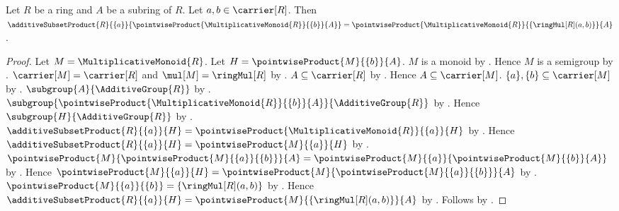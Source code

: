 \begin{proposition}\label{additive_subset_product_singleton_scalar_multiple}
    Let $R$ be a ring and $A$ be a subring of $R$.
    Let $a,b\in\carrier[R]$.
    Then $\additiveSubsetProduct{R}{\{a\}}{
            \pointwiseProduct{\MultiplicativeMonoid{R}}{\{b\}}{A}}
        =\pointwiseProduct{\MultiplicativeMonoid{R}}{
            \{\ringMul[R](a,b)\}}{A}$.
\end{proposition}
\begin{proof}
    Let $M=\MultiplicativeMonoid{R}$.
    Let $H=\pointwiseProduct{M}{\{b\}}{A}$.
    $M$ is a monoid by .
    Hence $M$ is a semigroup by .
    $\carrier[M]=\carrier[R]$ and $\mul[M]=\ringMul[R]$ by
        .
    $A\subseteq\carrier[R]$ by .
    Hence $A\subseteq\carrier[M]$.
    $\{a\},\{b\}\subseteq\carrier[M]$ by
        .
    $\subgroup{A}{\AdditiveGroup{R}}$ by
        .
    $\subgroup{
        \pointwiseProduct{\MultiplicativeMonoid{R}}{\{b\}}{A}}{
        \AdditiveGroup{R}}$ by
        .
    Hence $\subgroup{H}{\AdditiveGroup{R}}$ by \auto.
    $\additiveSubsetProduct{R}{\{a\}}{H}
        =\pointwiseProduct{\MultiplicativeMonoid{R}}{\{a\}}{H}$ by
        .
    Hence $\additiveSubsetProduct{R}{\{a\}}{H}
        =\pointwiseProduct{M}{\{a\}}{H}$ by \auto.
    $\pointwiseProduct{M}{
            \pointwiseProduct{M}{\{a\}}{\{b\}}}{A}
        =\pointwiseProduct{M}{\{a\}}{
            \pointwiseProduct{M}{\{b\}}{A}}$ by
        .
    Hence $\pointwiseProduct{M}{\{a\}}{H}
        =\pointwiseProduct{M}{
            \pointwiseProduct{M}{\{a\}}{\{b\}}}{A}$ by
        \auto.
    $\pointwiseProduct{M}{\{a\}}{\{b\}}
        =\{\ringMul[R](a,b)\}$ by
        .
    Hence $\additiveSubsetProduct{R}{\{a\}}{H}
        =\pointwiseProduct{M}{\{\ringMul[R](a,b)\}}{A}$ by
        \auto.
    Follows by \auto.
\end{proof}

